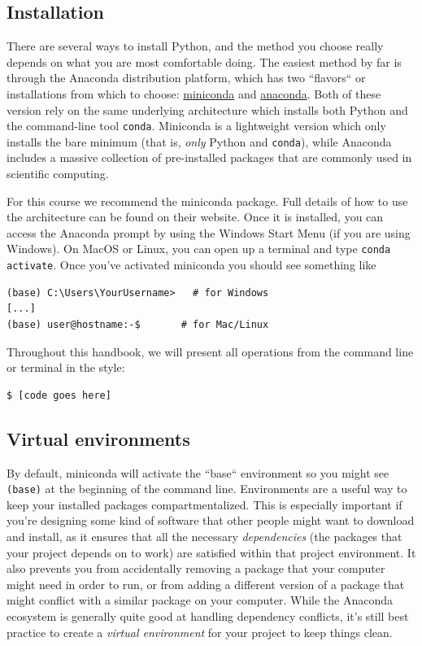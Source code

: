 \documentclass{tufte-book}
\begin{document}
\subsection{Installation}\label{subsec:python-install}

{There are several ways} to install Python, and the method you choose really depends on what you are most comfortable doing. The easiest method by far is through the Anaconda distribution platform, which has two ``flavors`` or installations from which to choose: \href{http://conda.pydata.org/miniconda.html}{miniconda} and \href{https://www.anaconda.com/download}{anaconda}. Both of these version rely on the same underlying architecture which installs both Python and the command-line tool \verb|conda|. Miniconda is a lightweight version which only installs the bare minimum (that is, \textit{only} Python and \verb|conda|), while Anaconda includes a massive collection of pre-installed packages that are commonly used in scientific computing. 

For this course we recommend the miniconda package. Full details of how to use the architecture can be found on their website. Once it is installed, you can access the Anaconda prompt by using the Windows Start Menu (if you are using Windows). On MacOS or Linux, you can open up a terminal and type \verb|conda activate|. Once you've activated miniconda you should see something like

\begin{lstlisting}[backgroundcolor=\color{lightgray}]
(base) C:\Users\YourUsername>   # for Windows
[...]
(base) user@hostname:-$       # for Mac/Linux
\end{lstlisting}

Throughout this handbook, we will present all operations from the command line or terminal in the style:
\begin{lstlisting}[backgroundcolor=\color{lightgray}]
$ [code goes here]
\end{lstlisting}

\subsection{Virtual environments}\label{subsec:python-venv}

{By default}, miniconda will activate the ``base`` environment so you might see \verb|(base)| at the beginning of the command line. Environments are a useful way to keep your installed packages compartmentalized. This is especially important if you're designing some kind of software that other people might want to download and install, as it ensures that all the necessary \textit{dependencies} (the packages that your project depends on to work) are satisfied within that project environment. It also prevents you from accidentally removing a package that your computer might need in order to run, or from adding a different version of a package that might conflict with a similar package on your computer. While the Anaconda ecosystem is generally quite good at handling dependency conflicts, it's still best practice to create a \textit{virtual environment} for your project to keep things clean. 
\end{document}
